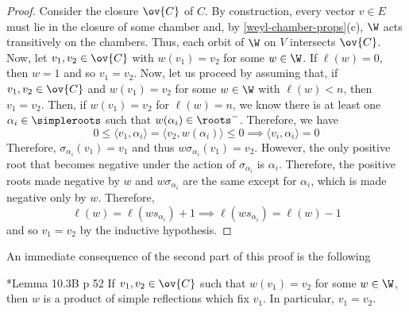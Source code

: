 \documentclass[11pt,leqno,oneside]{amsart}
\numberwithin{thm}{section}
\begin{document}
\begin{proof}
  Consider the closure \(\ov{C}\) of \(C\). By construction, every
  vector \(v \in E\) must lie in the closure of some chamber and, by
  \ref{weyl-chamber-props}(c), \(\W\) acts transitively on the
  chambers. Thus, each orbit 
  of \(\W\) on \(V\) intersects \(\ov{C}\). \\

  Now, let \(v_1, v_2 \in \ov{C}\) with \(w(v_1) = v_2\) for some \(w
  \in \W\). If \(\ell(w)
  = 0\), then \(w = 1\) and so \(v_1 = v_2\). Now, let us proceed by
  assuming that, if \(v_1, v_2 \in \ov{C}\) and \(w(v_1) = v_2\) for
  some \(w \in \W\) with \(\ell(w) < n\), then \(v_1 = v_2\). Then, if
  \(w(v_1) = v_2\) for \(\ell(w) = n\), we know there is at least one
  \(\alpha_i \in \simpleroots\) such that \(w(\alpha_i) \in
  \roots^-\). Therefore, we have \[
    0 \leq \langle v_1, \alpha_i \rangle = \langle v_2, w(\alpha_i)
    \rangle \leq 0 \implies \langle v_i, \alpha_i \rangle = 0
  \]
  Therefore, \(\sigma_{\alpha_i}(v_1) = v_1\) and thus \(w
  \sigma_{\alpha_i}(v_1) = v_2\). However, the only positive root that
  becomes negative under the action of \(\sigma_{\alpha_i}\) is
  \(\alpha_i\). Therefore, the positive roots made negative by \(w\)
  and \(w\sigma_{\alpha_i}\) are the same except for \(\alpha_i\),
  which is made negative only by \(w\). Therefore, \[
    \ell(w) = \ell(w s_{\alpha_i})+1 \implies \ell(w s_{\alpha_i}) =
    \ell(w) - 1
  \]
  and so \(v_1 = v_2\) by the inductive hypothesis.
\end{proof}
An immediate consequence of the second part of this proof is the
following
\begin{lem}\label{lem-10-3-B}
  \cite{humph}*{Lemma 10.3B p 52} If \(v_1,v_2 \in \ov{C}\) such that
  \(w(v_1) = v_2\) for some \(w \in \W\), then \(w\) is a product of
  simple reflections which fix \(v_1\). In particular, \(v_1 = v_2\).
\end{lem}
\end{document}
